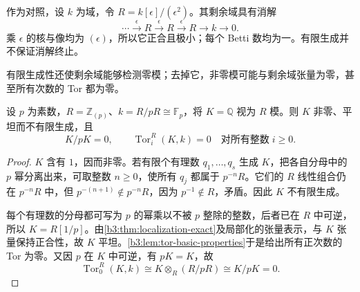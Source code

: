 \ProseParagraphBreak
作为对照，设 \(k\) 为域，令 \(R=k[\epsilon]/(\epsilon^2)\)。其剩余域具有消解
\[
	\cdots\xrightarrow{\epsilon}R\xrightarrow{\epsilon}R \xrightarrow{\epsilon}R\longrightarrow k\longrightarrow0.
\]
乘 \(\epsilon\) 的核与像均为 \((\epsilon)\)，所以它正合且极小；每个 Betti 数均为一。有限生成并不保证消解终止。

\ProseParagraphBreak
有限生成性还使剩余域能够检测零模；去掉它，非零模可能与剩余域张量为零，甚至所有次数的 Tor 都为零。

\begin{proposition}\label{b3:prop:residue-detection-finiteness}
	设 \(p\) 为素数，\(R=\mathbb Z_{(p)}\)、\(k=R/pR\cong\mathbb F_p\)，将 \(K=\mathbb Q\) 视为 \(R\) 模。则 \(K\) 非零、平坦而不有限生成，且
	\[
		K/pK=0,\qquad \operatorname{Tor}_i^R(K,k)=0\quad\text{对所有整数}\;i\ge0.
	\]
\end{proposition}
\begin{proof}
	\(K\) 含有 \(1\)，因而非零。若有限个有理数 \(q_1,\ldots,q_s\) 生成 \(K\)，把各自分母中的 \(p\) 幂分离出来，可取整数 \(n\ge0\)，使所有 \(q_j\) 都属于 \(p^{-n}R\)。它们的 \(R\) 线性组合仍在 \(p^{-n}R\) 中，但 \(p^{-(n+1)}\notin p^{-n}R\)，因为 \(p^{-1}\notin R\)，矛盾。因此 \(K\) 不有限生成。

	每个有理数的分母都可写为 \(p\) 的幂乘以不被 \(p\) 整除的整数，后者已在 \(R\) 中可逆，所以 \(K=R[1/p]\)。由\cref{b3:thm:localization-exact}及局部化的张量表示，与 \(K\) 张量保持正合性，故 \(K\) 平坦。\cref{b3:lem:tor-basic-properties}于是给出所有正次数的 Tor 为零。又因 \(p\) 在 \(K\) 中可逆，有 \(pK=K\)，故
	\[
		\operatorname{Tor}_0^R(K,k) \cong K\otimes_R(R/pR)\cong K/pK=0.
	\]
\end{proof}
